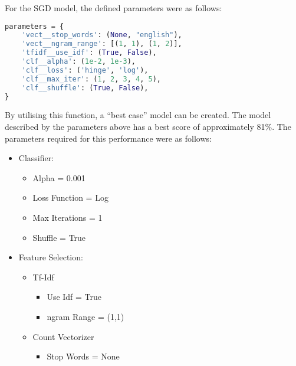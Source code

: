 For the SGD model, the defined parameters were as
follows:

\begin{lstlisting}[language=Python, caption={SGD Model Parameters},
label={lst:sgdParam}]
parameters = {
    'vect__stop_words': (None, "english"),
    'vect__ngram_range': [(1, 1), (1, 2)],
    'tfidf__use_idf': (True, False),
    'clf__alpha': (1e-2, 1e-3),
    'clf__loss': ('hinge', 'log'),
    'clf__max_iter': (1, 2, 3, 4, 5),
    'clf__shuffle': (True, False),
}
\end{lstlisting}

By utilising this function, a ``best case'' model can be created. The model
described by the parameters above has a best score of approximately 81\%. The
parameters required for this performance were as follows:

\begin{itemize}
	\item Classifier:
	\begin{itemize}
		\item Alpha = 0.001
		\item Loss Function = Log
		\item Max Iterations = 1
		\item Shuffle = True
	\end{itemize}
	\item Feature Selection:
	\begin{itemize}
		\item Tf-Idf
		\begin{itemize}
			\item Use Idf = True
			\item ngram Range = (1,1)
		\end{itemize}
		\item Count Vectorizer
		\begin{itemize}
			\item Stop Words = None
		\end{itemize}
	\end{itemize}
\end{itemize}
